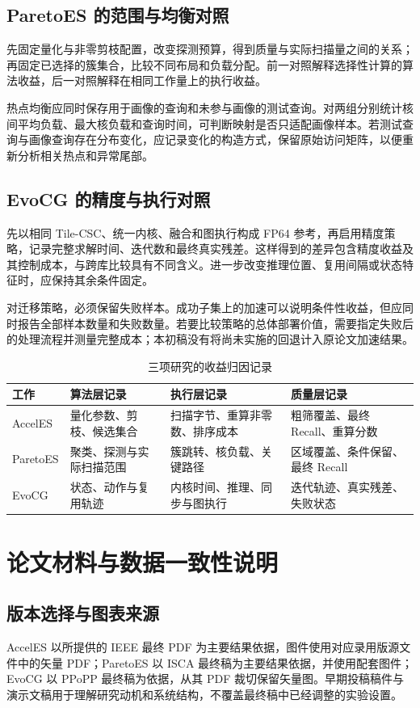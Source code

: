 \subsection{ParetoES 的范围与均衡对照}
先固定量化与非零剪枝配置，改变探测预算，得到质量与实际扫描量之间的关系；再固定已选择的簇集合，比较不同布局和负载分配。前一对照解释选择性计算的算法收益，后一对照解释在相同工作量上的执行收益。

热点均衡应同时保存用于画像的查询和未参与画像的测试查询。对两组分别统计核间平均负载、最大核负载和查询时间，可判断映射是否只适配画像样本。若测试查询与画像查询存在分布变化，应记录变化的构造方式，保留原始访问矩阵，以便重新分析相关热点和异常尾部。

\subsection{EvoCG 的精度与执行对照}
先以相同 Tile-CSC、统一内核、融合和图执行构成 FP64 参考，再启用精度策略，记录完整求解时间、迭代数和最终真实残差。这样得到的差异包含精度收益及其控制成本，与跨库比较具有不同含义。进一步改变推理位置、复用间隔或状态特征时，应保持其余条件固定。

对迁移策略，必须保留失败样本。成功子集上的加速可以说明条件性收益，但应同时报告全部样本数量和失败数量。若要比较策略的总体部署价值，需要指定失败后的处理流程并测量完整成本；本初稿没有将尚未实施的回退计入原论文加速结果。

\begin{table}[htbp]\centering\caption{三项研究的收益归因记录}
\begin{tabularx}{\textwidth}{p{2cm}XXX}\toprule
工作&算法层记录&执行层记录&质量层记录\\\midrule
AccelES&量化参数、剪枝、候选集合&扫描字节、重算非零数、排序成本&粗筛覆盖、最终 Recall、重算分数\\
ParetoES&聚类、探测与实际扫描范围&簇跳转、核负载、关键路径&区域覆盖、条件保留、最终 Recall\\
EvoCG&状态、动作与复用轨迹&内核时间、推理、同步与图执行&迭代轨迹、真实残差、失败状态\\\bottomrule
\end{tabularx}\end{table}

\section{论文材料与数据一致性说明}
\subsection{版本选择与图表来源}
AccelES 以所提供的 IEEE 最终 PDF 为主要结果依据，图件使用对应录用版源文件中的矢量 PDF；ParetoES 以 ISCA 最终稿为主要结果依据，并使用配套图件；EvoCG 以 PPoPP 最终稿为依据，从其 PDF 裁切保留矢量图。早期投稿稿件与演示文稿用于理解研究动机和系统结构，不覆盖最终稿中已经调整的实验设置。

